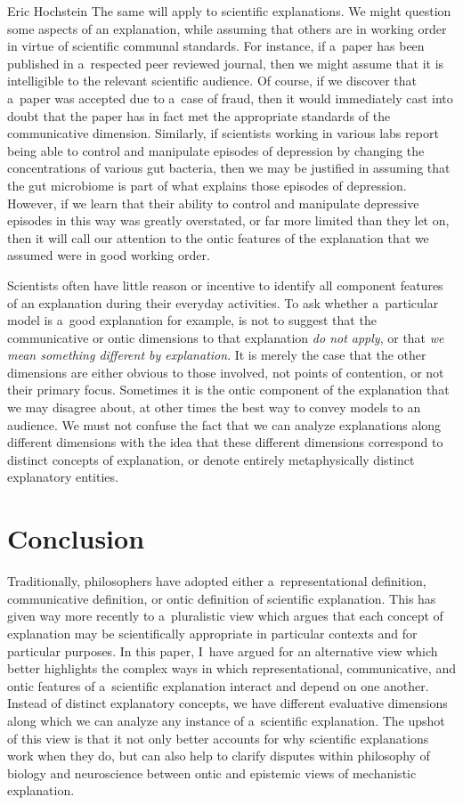\begin{artengenv}{Eric Hochstein}
The same will apply to scientific explanations. We might question some aspects of an explanation, while assuming that others are in working order in virtue of scientific communal standards. For instance, if a~paper has been published in a~respected peer reviewed journal, then we might assume that it is intelligible to the relevant scientific audience. Of course, if we discover that a~paper was accepted due to a~case of fraud, then it would immediately cast into doubt that the paper has in fact met the appropriate standards of the communicative dimension. Similarly, if scientists working in various labs report being able to control and manipulate episodes of depression by changing the concentrations of various gut bacteria, then we may be justified in assuming that the gut microbiome is part of what explains those episodes of depression. However, if we learn that their ability to control and manipulate depressive episodes in this way was greatly overstated, or far more limited than they let on, then it will call our attention to the ontic features of the explanation that we assumed were in good working order.

Scientists often have little reason or incentive to identify all component features of an explanation during their everyday activities. To ask whether a~particular model is a~good explanation for example, is not to suggest that the communicative or ontic dimensions to that explanation \textit{do not apply}, or that \textit{we mean something different by explanation}. It is merely the case that the other dimensions are either obvious to those involved, not points of contention, or not their primary focus. Sometimes it is the ontic component of the explanation that we may disagree about, at other times the best way to convey models to an audience. We must not confuse the fact that we can analyze explanations along different dimensions with the idea that these different dimensions correspond to distinct concepts of explanation, or denote entirely metaphysically distinct explanatory entities.

\section*{Conclusion}
Traditionally, philosophers have adopted either a~representational definition, communicative definition, or ontic definition of scientific explanation. This has given way more recently to a~pluralistic view which argues that each concept of explanation may be scientifically appropriate in particular contexts and for particular purposes. In this paper, I~have argued for an alternative view which better highlights the complex ways in which representational, communicative, and ontic features of a~scientific explanation interact and depend on one another. Instead of distinct explanatory concepts, we have different evaluative dimensions along which we can analyze any instance of a~scientific explanation. The upshot of this view is that it not only better accounts for why scientific explanations work when they do, but can also help to clarify disputes within philosophy of biology and neuroscience between ontic and epistemic views of mechanistic explanation.


\end{artengenv}
